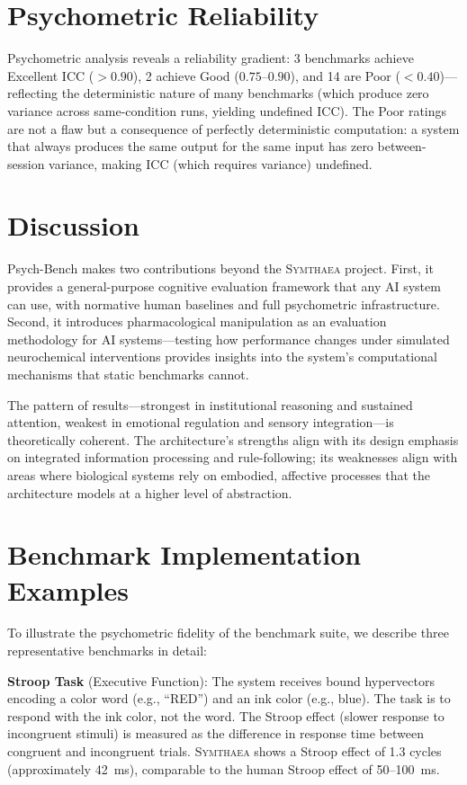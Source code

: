 \documentclass[12pt]{book}
\newcommand{\symthaea}{\textsc{Symthaea}}
\begin{document}
\section{Psychometric Reliability}

Psychometric analysis reveals a reliability gradient: 3 benchmarks achieve Excellent ICC ($> 0.90$), 2 achieve Good ($0.75$--$0.90$), and 14 are Poor ($< 0.40$)---reflecting the deterministic nature of many benchmarks (which produce zero variance across same-condition runs, yielding undefined ICC). The Poor ratings are not a flaw but a consequence of perfectly deterministic computation: a system that always produces the same output for the same input has zero between-session variance, making ICC (which requires variance) undefined.

\section{Discussion}

Psych-Bench makes two contributions beyond the \symthaea{} project. First, it provides a general-purpose cognitive evaluation framework that any AI system can use, with normative human baselines and full psychometric infrastructure. Second, it introduces pharmacological manipulation as an evaluation methodology for AI systems---testing how performance changes under simulated neurochemical interventions provides insights into the system's computational mechanisms that static benchmarks cannot.

The pattern of results---strongest in institutional reasoning and sustained attention, weakest in emotional regulation and sensory integration---is theoretically coherent. The architecture's strengths align with its design emphasis on integrated information processing and rule-following; its weaknesses align with areas where biological systems rely on embodied, affective processes that the architecture models at a higher level of abstraction.

\section{Benchmark Implementation Examples}

To illustrate the psychometric fidelity of the benchmark suite, we describe three representative benchmarks in detail:

\textbf{Stroop Task} (Executive Function): The system receives bound hypervectors encoding a color word (e.g., ``RED'') and an ink color (e.g., blue). The task is to respond with the ink color, not the word. The Stroop effect (slower response to incongruent stimuli) is measured as the difference in response time between congruent and incongruent trials. \symthaea{} shows a Stroop effect of 1.3 cycles (approximately 42~ms), comparable to the human Stroop effect of 50--100~ms.
\end{document}
